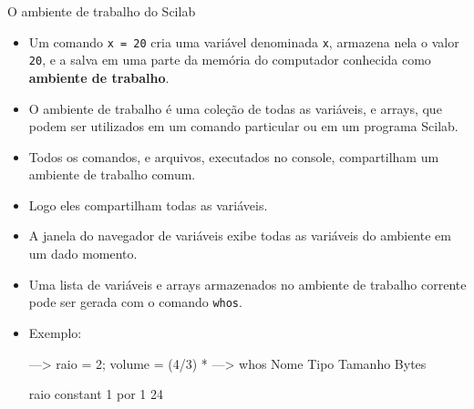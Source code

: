 \begin{frame}{O ambiente de trabalho do Scilab}
  \begin{itemize}
    \item Um comando \texttt{x = 20} cria uma variável denominada
    \texttt{x}, armazena nela o valor \texttt{20}, e a salva em uma
    parte da memória do computador conhecida como \textbf{ambiente de
      trabalho}.
    \item O ambiente de trabalho é uma \alert{coleção de todas as
      variáveis}, e arrays, que podem ser utilizados em um comando
    particular ou em um programa Scilab.
    \item Todos os comandos, e arquivos, executados no console,
    \alert{compartilham} um ambiente de trabalho comum.
    \item Logo eles \alert{compartilham todas as variáveis}.
    \item A \alert{janela do navegador de variáveis} exibe todas as
    variáveis do ambiente em um dado momento.
    \item Uma \alert{lista de variáveis e arrays} armazenados no
    ambiente de trabalho corrente pode ser gerada com o comando
    \texttt{whos}.
    \item Exemplo:
    \begin{pygmented}[lang=text]
---> raio = 2; volume = (4/3) * %
---> whos
Nome                     Tipo           Tamanho        Bytes        


raio                     constant       1 por 1        24           


\end{pygmented}
\end{itemize}
\end{frame}
